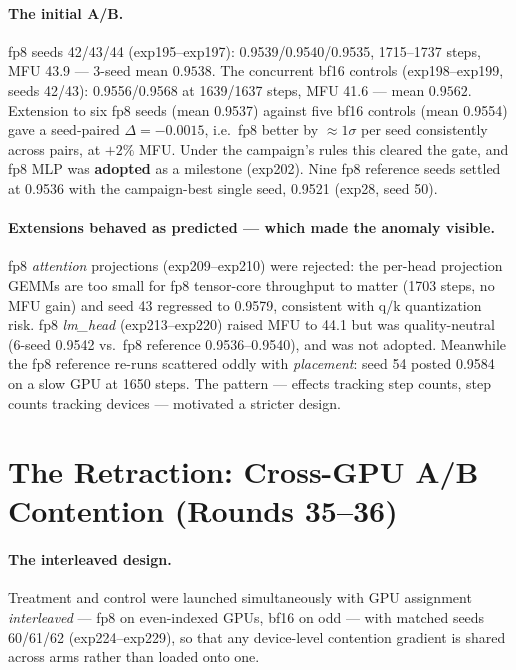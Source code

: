 \documentclass{article}
\begin{document}
\paragraph{The initial A/B.} fp8 seeds 42/43/44 (exp195--exp197): 0.9539/0.9540/0.9535, 1715--1737 steps, MFU 43.9 --- 3-seed mean $0.9538$. The concurrent bf16 controls (exp198--exp199, seeds 42/43): 0.9556/0.9568 at 1639/1637 steps, MFU 41.6 --- mean $0.9562$. Extension to six fp8 seeds (mean 0.9537) against five bf16 controls (mean 0.9554) gave a seed-paired $\Delta = -0.0015$, i.e.\ fp8 better by $\approx 1\sigma$ per seed consistently across pairs, at $+2\%$ MFU. Under the campaign's rules this cleared the gate, and fp8 MLP was \textbf{adopted} as a milestone (exp202). Nine fp8 reference seeds settled at 0.9536 with the campaign-best single seed, 0.9521 (exp28, seed 50).

\paragraph{Extensions behaved as predicted --- which made the anomaly visible.} fp8 \emph{attention} projections (exp209--exp210) were rejected: the per-head projection GEMMs are too small for fp8 tensor-core throughput to matter (1703 steps, no MFU gain) and seed 43 regressed to 0.9579, consistent with q/k quantization risk. fp8 \emph{lm\_head} (exp213--exp220) raised MFU to 44.1 but was quality-neutral (6-seed 0.9542 vs.\ fp8 reference 0.9536--0.9540), and was not adopted. Meanwhile the fp8 reference re-runs scattered oddly with \emph{placement}: seed 54 posted 0.9584 on a slow GPU at 1650 steps. The pattern --- effects tracking step counts, step counts tracking devices --- motivated a stricter design.

\section{The Retraction: Cross-GPU A/B Contention (Rounds 35--36)}
\label{sec:retraction}

\paragraph{The interleaved design.} Treatment and control were launched simultaneously with GPU assignment \emph{interleaved} --- fp8 on even-indexed GPUs, bf16 on odd --- with matched seeds 60/61/62 (exp224--exp229), so that any device-level contention gradient is shared across arms rather than loaded onto one.
\end{document}
